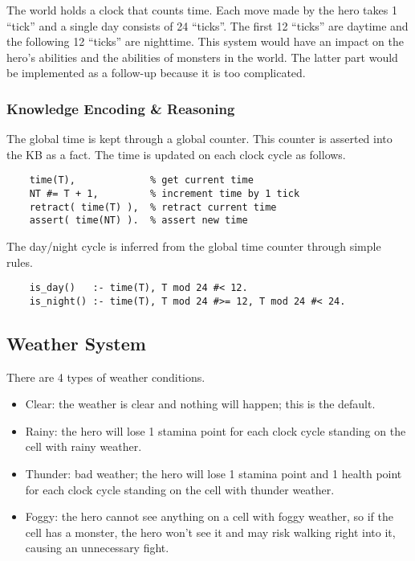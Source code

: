 \documentclass[10pt]{article}
\begin{document}
The world holds a clock that counts time. Each move made by the hero takes 1 “tick” and a single day consists of 24 “ticks”. The first 12 “ticks” are daytime and the following 12 “ticks” are nighttime. This system would have an impact on the hero’s abilities and the abilities of monsters in the world. The latter part would be implemented as a follow-up because it is too complicated.

\subsubsection*{Knowledge Encoding \& Reasoning}

The global time is kept through a global counter. This counter is asserted into the KB as a fact. The time is updated on each clock cycle as follows.

\begin{verbatim}
    time(T),             % get current time
    NT #= T + 1,         % increment time by 1 tick
    retract( time(T) ),  % retract current time
    assert( time(NT) ).  % assert new time
\end{verbatim}

The day/night cycle is inferred from the global time counter through simple rules.

\begin{verbatim}
    is_day()   :- time(T), T mod 24 #< 12.
    is_night() :- time(T), T mod 24 #>= 12, T mod 24 #< 24.
\end{verbatim}


\subsection{Weather System}

There are 4 types of weather conditions.

\begin{itemize}
\item Clear: the weather is clear and nothing will happen; this is the default.
\item Rainy: the hero will lose 1 stamina point for each clock cycle standing on the cell with rainy weather.
\item Thunder: bad weather; the hero will lose 1 stamina point and 1 health point for each clock cycle standing on the cell with thunder weather.
\item Foggy: the hero cannot see anything on a cell with foggy weather, so if the cell has a monster, the hero won’t see it and may risk walking right into it, causing an unnecessary fight.
\end{itemize}
\end{document}
